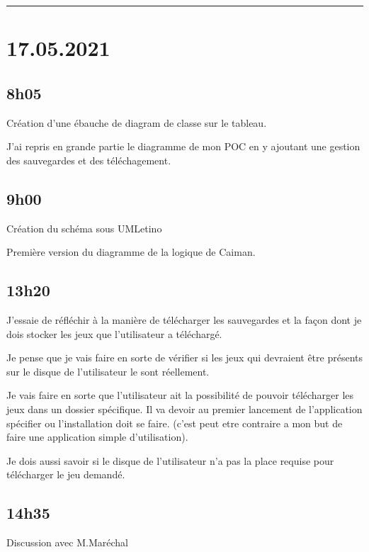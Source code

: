 \documentclass[a4paper,12pt,french]{sphinxmanual}
\begin{document}
\bigskip\hrule\bigskip



\section{17.05.2021}
\label{\detokenize{logbook:id118}}

\subsection{8h05}
\label{\detokenize{logbook:id119}}
\sphinxAtStartPar
Création d’une ébauche de diagram de classe sur le tableau.

\sphinxAtStartPar
J’ai repris en grande partie le diagramme de mon POC en y ajoutant une gestion des sauvegardes et des téléchagement.


\subsection{9h00}
\label{\detokenize{logbook:id120}}
\sphinxAtStartPar
Création du schéma sous UMLetino

\sphinxAtStartPar
Première version du diagramme de la logique de Caiman.


\subsection{13h20}
\label{\detokenize{logbook:id121}}
\sphinxAtStartPar
J’essaie de réfléchir à la manière de télécharger les sauvegardes et la façon dont je dois stocker les jeux que l’utilisateur a téléchargé.

\sphinxAtStartPar
Je pense que je vais faire en sorte de vérifier si les jeux qui devraient être présents sur le disque de l’utilisateur le sont réellement.

\sphinxAtStartPar
Je vais faire en sorte que l’utilisateur ait la possibilité de pouvoir télécharger les jeux dans un dossier spécifique. Il va devoir au premier lancement de l’application spécifier ou l’installation doit se faire. (c’est peut etre contraire a mon but de faire une application simple d’utilisation).

\sphinxAtStartPar
Je dois aussi savoir si le disque de l’utilisateur n’a pas la place requise pour télécharger le jeu demandé.


\subsection{14h35}
\label{\detokenize{logbook:id122}}
\sphinxAtStartPar
Discussion avec M.Maréchal
\end{document}
